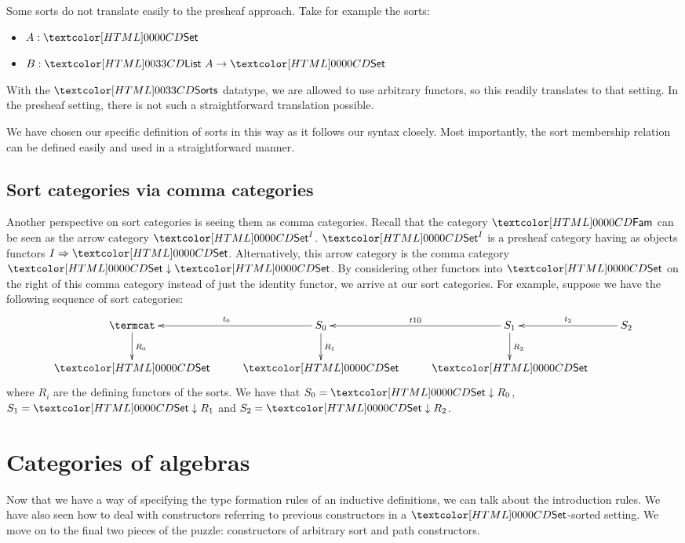 Some sorts do not translate easily to the presheaf approach. Take for
example the sorts:
\begin{itemize}
\item $A : \Set$
\item $B : \List\ A \to \Set$
\end{itemize}
With the $\sortsty$ datatype, we are allowed to use arbitrary
functors, so this readily translates to that setting. In the presheaf
setting, there is not such a straightforward translation possible.

We have chosen our specific definition of sorts in this way as it
follows our syntax closely. Most importantly, the sort membership
relation can be defined easily and used in a straightforward manner.

\subsection{Sort categories via comma categories}

Another perspective on sort categories is seeing them as comma
categories. Recall that the category $\Fam$ can be seen as the arrow
category $\Set^I$. $\Set^I$ is a presheaf category having as objects
functors $\Func{I}{\Set}$. Alternatively, this arrow category is the
comma category $\Set \downarrow \Set$. By considering other functors
into $\Set$ on the right of this comma category instead of just the
identity functor, we arrive at our sort categories. For example,
suppose we have the following sequence of sort categories:
$$
\xymatrix{
\termcat
\ar[d]^{R_0}
&S_0
\ar[d]^{R_1}
\ar[l]_{t_0}
&S_1
\ar[d]^{R_2}
\ar[l]_{t10}
&S_2
\ar[l]_{t_2} \\
\Set
&\Set
&\Set
}
$$
where $R_i$ are the defining functors of the sorts. We have that
$S_0 = \Set \downarrow R_0$, $S_1 = \Set \downarrow R_1$ and
$S_2 = \Set \downarrow R_2$.

\section{Categories of algebras}
\label{categories-of-algebras}

Now that we have a way of specifying the type formation rules of an
inductive definitions, we can talk about the introduction rules. We
have also seen how to deal with constructors referring to previous
constructors in a $\Set$-sorted setting. We move on to the final two
pieces of the puzzle: constructors of arbitrary sort and path
constructors.


